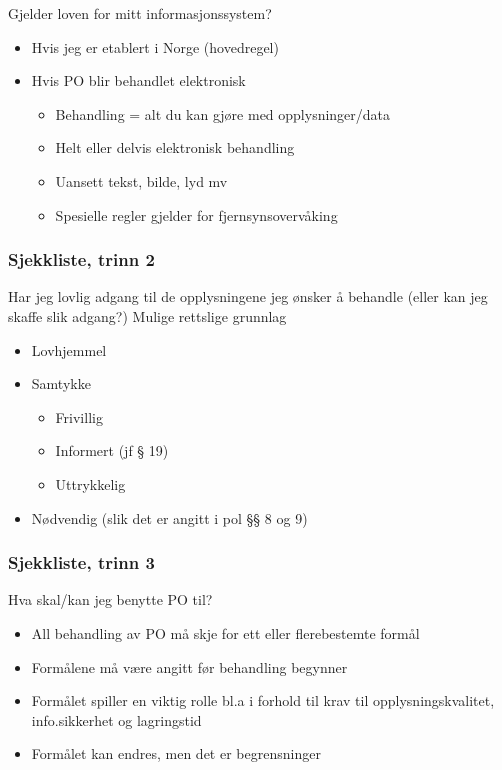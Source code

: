 \documentclass[11pt]{article}
\begin{document}
    Gjelder loven for mitt informasjonssystem? 
\begin{itemize}
\item Hvis jeg er etablert i Norge (hovedregel)
\item Hvis PO blir behandlet elektronisk

\begin{itemize}
\item Behandling = alt du kan gjøre med opplysninger/data
\item Helt eller delvis elektronisk behandling
\item Uansett tekst, bilde, lyd mv
\item Spesielle regler gjelder for fjernsynsovervåking
\end{itemize}

\end{itemize}
\subsubsection{Sjekkliste, trinn 2}
\label{sec-17.1.2}

    Har jeg lovlig adgang til de opplysningene jeg ønsker å behandle (eller kan jeg skaffe slik adgang?)
    Mulige rettslige grunnlag 
\begin{itemize}
\item Lovhjemmel
\item Samtykke

\begin{itemize}
\item Frivillig
\item Informert (jf § 19)
\item Uttrykkelig
\end{itemize}

\item Nødvendig (slik det er angitt i pol §§ 8 og 9)
\end{itemize}
\subsubsection{Sjekkliste, trinn 3}
\label{sec-17.1.3}

    Hva skal/kan jeg benytte PO til? 
\begin{itemize}
\item All behandling av PO må skje for ett eller flerebestemte formål
\item Formålene må være angitt før behandling begynner
\item Formålet spiller en viktig rolle bl.a i forhold til krav til opplysningskvalitet, 
      info.sikkerhet og lagringstid
\item Formålet kan endres, men det er begrensninger
\end{itemize}
\end{document}
